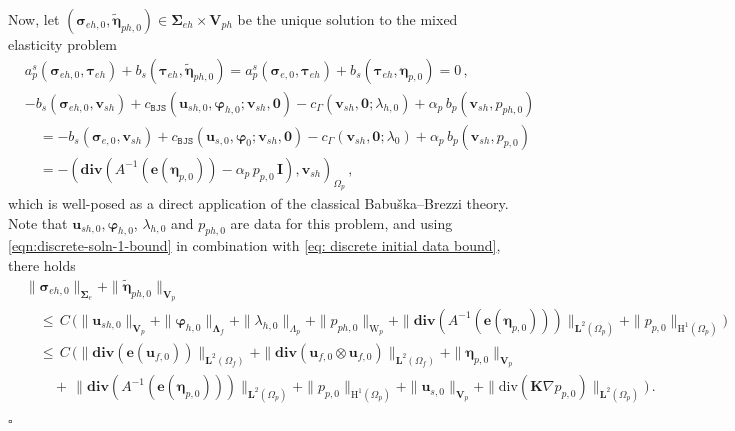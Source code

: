 \documentclass[11pt]{article}
\numberwithin{equation}{section}
\newcommand{\ds}{\displaystyle}
\newcommand{\bLambda}{{\boldsymbol\Lambda}}
\newcommand{\bbeta}{{\boldsymbol\eta}}
\newcommand{\bsi}{{\boldsymbol\sigma}}
\newcommand{\bSigma}{{\boldsymbol\Sigma}}
\newcommand{\bvarphi}{{\boldsymbol\varphi}}
\newcommand{\btau}{{\boldsymbol\tau}}
\newcommand{\bv}{{\mathbf{v}}}
\newcommand{\bu}{\mathbf{u}}
\newcommand{\be}{{\mathbf{e}}}
\newcommand{\0}{{\mathbf{0}}}
\def\bK{\mathbf{K}}
\def\bI{\mathbf{I}}
\def\bV{\mathbf{V}}
\newcommand{\bL}{\mathbf{L}}
\def\H{\mathrm{H}}
\def\W{\mathrm{W}}
\def\BJS{\mathtt{BJS}}
\def\bdiv{\mathbf{div}}
\def\div{\mathrm{div}}
\newenvironment{proof}{\noindent{\it Proof.}}{\hfill$\square$}
\numberwithin{equation}{section}
\begin{document}
\begin{proof}
Now, let $(\bsi_{eh,0},\widetilde\bbeta_{ph,0}) \in \bSigma_{eh}\times\bV_{ph}$ be the unique solution to the mixed elasticity problem
%
\begin{subequations}\label{eq:mixed-elasticity-discrete-problem}
\begin{align}
&  a^s_p(\bsi_{eh,0},\btau_{eh}) + b_s(\btau_{eh},\widetilde\bbeta_{ph,0})= a^s_p(\bsi_{e,0},\btau_{eh}) + b_s(\btau_{eh},\bbeta_{p,0}) = 0\,, \label{eq:semi-discrete-weak-formulation-1k}  \\
& \ds - b_s(\bsi_{eh,0},\bv_{sh})  + c_{\BJS}(\bu_{sh,0},\bvarphi_{h,0};\bv_{sh},\0) - c_{\Gamma}(\bv_{sh},\0;\lambda_{h,0}) + \alpha_p\,b_p(\bv_{sh},p_{ph,0}) \nonumber \\[1ex] 
& \ds \quad = 
-b_s(\bsi_{e,0},\bv_{sh})  + c_{\BJS}(\bu_{s,0},\bvarphi_{0};\bv_{sh},\0) - c_{\Gamma}(\bv_{sh},\0;\lambda_{0}) + \alpha_p\,b_p(\bv_{sh},p_{p,0}) \nonumber \\[1ex]
& \ds \quad = -(\bdiv(A^{-1}(\be(\bbeta_{p,0})) - \alpha_p\,p_{p,0}\,\bI),\bv_{sh})_{\Omega_p}\,, \label{eq:semi-discrete-weak-formulation-1l} 
\end{align}
\end{subequations}
%
which is well-posed as a direct application of the classical Babu{\v s}ka--Brezzi theory. 
Note that $\bu_{sh,0}, \bvarphi_{h,0}$, $\lambda_{h,0}$ and $p_{ph,0}$ are data for this problem, and using \eqref{eqn:discrete-soln-1-bound} in combination with \eqref{eq: discrete initial data bound}, there holds
\begin{align}
&\|\bsi_{eh,0}\|_{\bSigma_{e}} 
+ \|\widetilde\bbeta_{ph,0}\|_{\bV_p}  \nonumber \\
&\quad \leq\, C\,\Big( \|\bu_{sh,0}\|_{\bV_p} 
+ \|\bvarphi_{h,0}\|_{\bLambda_{f}} 
+ \|\lambda_{h,0}\|_{\Lambda_{p}} 
+ \|p_{ph,0}\|_{\W_{p}} 
+ \|\bdiv(A^{-1}(\be(\bbeta_{p,0})))\|_{\bL^2(\Omega_p)}
+ \|p_{p,0}\|_{\H^1(\Omega_p)} \Big)\nonumber \\
&\quad \leq\, C\,\Big( \|\bdiv(\be(\bu_{f,0}))\|_{\bL^{2}(\Omega_f)} 
+ \|\bdiv(\bu_{f,0}\otimes \bu_{f,0})\|_{\bL^{2}(\Omega_f)} 
+ \|\bbeta_{p,0}\|_{\bV_p}  \nonumber \\
&\qquad +\, \|\bdiv(A^{-1}(\be(\bbeta_{p,0})))\|_{\bL^2(\Omega_p)}  
+ \|p_{p,0}\|_{\H^1(\Omega_p)}
+ \|\bu_{s,0}\|_{\bV_p}
+ \|\div(\bK\nabla p_{p,0})\|_{\bL^2(\Omega_p)}\Big) \,.\label{eq: discrete sige-etap-bound}
\end{align}


\end{proof}
\end{document}
